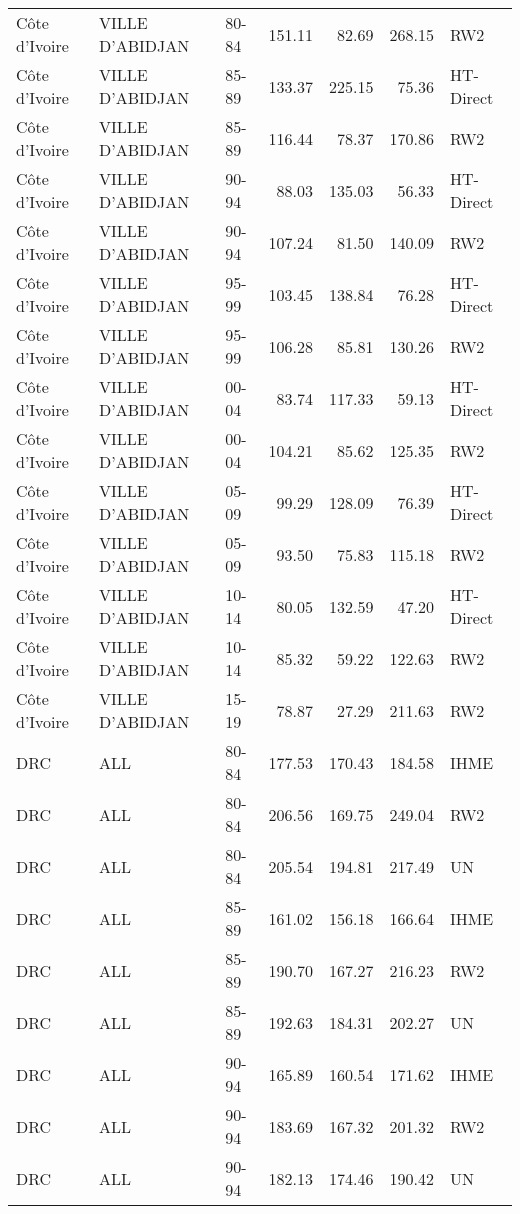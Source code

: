 \begin{longtable}{lllrrrl}
  C\^{o}te d'Ivoire & VILLE D'ABIDJAN & 80-84 & 151.11 & 82.69 & 268.15 & RW2 \\ 
  C\^{o}te d'Ivoire & VILLE D'ABIDJAN & 85-89 & 133.37 & 225.15 & 75.36 & HT-Direct \\ 
  C\^{o}te d'Ivoire & VILLE D'ABIDJAN & 85-89 & 116.44 & 78.37 & 170.86 & RW2 \\ 
  C\^{o}te d'Ivoire & VILLE D'ABIDJAN & 90-94 & 88.03 & 135.03 & 56.33 & HT-Direct \\ 
  C\^{o}te d'Ivoire & VILLE D'ABIDJAN & 90-94 & 107.24 & 81.50 & 140.09 & RW2 \\ 
  C\^{o}te d'Ivoire & VILLE D'ABIDJAN & 95-99 & 103.45 & 138.84 & 76.28 & HT-Direct \\ 
  C\^{o}te d'Ivoire & VILLE D'ABIDJAN & 95-99 & 106.28 & 85.81 & 130.26 & RW2 \\ 
  C\^{o}te d'Ivoire & VILLE D'ABIDJAN & 00-04 & 83.74 & 117.33 & 59.13 & HT-Direct \\ 
  C\^{o}te d'Ivoire & VILLE D'ABIDJAN & 00-04 & 104.21 & 85.62 & 125.35 & RW2 \\ 
  C\^{o}te d'Ivoire & VILLE D'ABIDJAN & 05-09 & 99.29 & 128.09 & 76.39 & HT-Direct \\ 
  C\^{o}te d'Ivoire & VILLE D'ABIDJAN & 05-09 & 93.50 & 75.83 & 115.18 & RW2 \\ 
  C\^{o}te d'Ivoire & VILLE D'ABIDJAN & 10-14 & 80.05 & 132.59 & 47.20 & HT-Direct \\ 
  C\^{o}te d'Ivoire & VILLE D'ABIDJAN & 10-14 & 85.32 & 59.22 & 122.63 & RW2 \\ 
  C\^{o}te d'Ivoire & VILLE D'ABIDJAN & 15-19 & 78.87 & 27.29 & 211.63 & RW2 \\ 
  DRC & ALL & 80-84 & 177.53 & 170.43 & 184.58 & IHME \\ 
  DRC & ALL & 80-84 & 206.56 & 169.75 & 249.04 & RW2 \\ 
  DRC & ALL & 80-84 & 205.54 & 194.81 & 217.49 & UN \\ 
  DRC & ALL & 85-89 & 161.02 & 156.18 & 166.64 & IHME \\ 
  DRC & ALL & 85-89 & 190.70 & 167.27 & 216.23 & RW2 \\ 
  DRC & ALL & 85-89 & 192.63 & 184.31 & 202.27 & UN \\ 
  DRC & ALL & 90-94 & 165.89 & 160.54 & 171.62 & IHME \\ 
  DRC & ALL & 90-94 & 183.69 & 167.32 & 201.32 & RW2 \\ 
  DRC & ALL & 90-94 & 182.13 & 174.46 & 190.42 & UN \\ 

\end{longtable}
